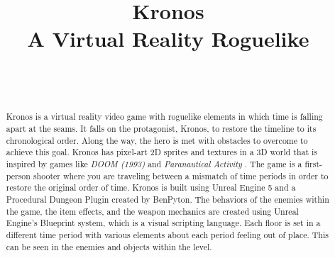 \documentclass{sigchi}
\def\plaintitle{Kronos\\ \large A Virtual Reality Roguelike}
\begin{document}
\title{\plaintitle}

\author{%
  \\
  \\
}

\maketitle

\begin{abstract}
  Kronos is a virtual reality video game with roguelike elements in which time is falling apart at the seams. It falls on the protagonist, Kronos, to restore the timeline to its chronological order. Along the way, the hero is met with obstacles to overcome to achieve this goal. Kronos has pixel-art 2D sprites and textures in a 3D world that is inspired by games like \textit{DOOM (1993)} and \textit{Paranautical Activity} \cite{paranautical}. The game is a first-person shooter where you are traveling between a mismatch of time periods in order to restore the original order of time. \newline Kronos is built using Unreal Engine 5 and a Procedural Dungeon Plugin created by BenPyton. The behaviors of the enemies within the game, the item effects, and the weapon mechanics are created using Unreal Engine’s Blueprint system, which is a visual scripting language. Each floor is set in a different time period with various elements about each period feeling out of place. This can be seen in the enemies and objects within the level.
\end{abstract}


\end{document}
